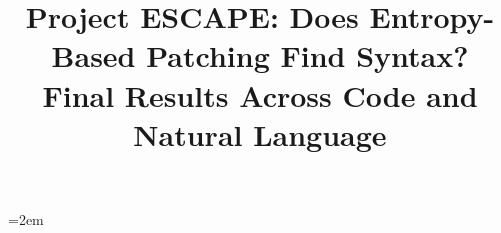 \usepackage{times}
\usepackage{latexsym}
\usepackage[T1]{fontenc}
\usepackage[utf8]{inputenc}
\usepackage{graphicx}
\usepackage{booktabs}
\usepackage{amsmath}
\usepackage{xcolor}
\setlength{\titlebox}{6cm}
\emergencystretch=2em
\makeatletter\g@addto@macro\UrlBreaks{\do\-}\makeatother
\title{Project ESCAPE: Does Entropy-Based Patching Find Syntax?\\
Final Results Across Code and Natural Language}


